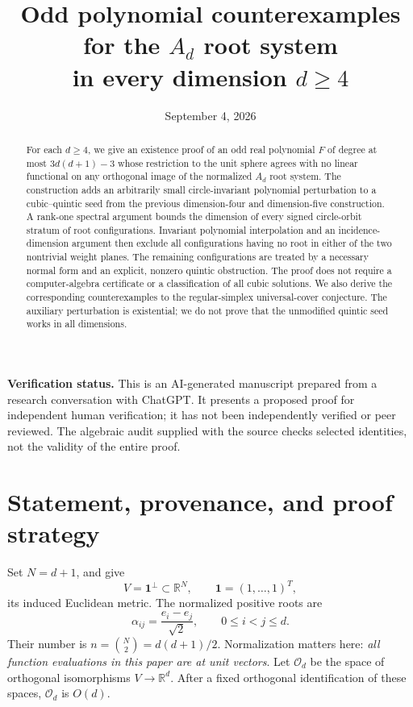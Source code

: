 \documentclass[11pt,reqno]{amsart}
\title[Odd polynomial counterexamples for the $A_d$ root system]
{Odd polynomial counterexamples for the $A_d$ root system\\
in every dimension $d\geq4$}
\author{}
\date{September 4, 2026}
\theoremstyle{definition}
\theoremstyle{remark}
\numberwithin{equation}{section}
\newcommand{\R}{\mathbb R}
\newcommand{\one}{\mathbf 1}
\newcommand{\Orth}{\mathcal O_d}
\begin{document}
\begin{abstract}
For each $d\geq4$, we give an existence proof of an odd real polynomial
$F$ of degree at most $3d(d+1)-3$ whose restriction to the unit sphere
agrees with no linear functional on any orthogonal image of the normalized
$A_d$ root system. The construction adds an arbitrarily small
circle-invariant polynomial perturbation to a cubic--quintic seed from the
previous dimension-four and dimension-five construction. A rank-one
spectral argument bounds the dimension of every signed circle-orbit
stratum of root configurations. Invariant polynomial interpolation and an
incidence-dimension argument then exclude all configurations having no
root in either of the two nontrivial weight planes. The remaining
configurations are treated by a necessary normal form and an explicit,
nonzero quintic obstruction. The proof does not require a
computer-algebra certificate or a classification of all cubic solutions.
We also derive the corresponding counterexamples to the regular-simplex
universal-cover conjecture. The auxiliary perturbation is existential;
we do not prove that the unmodified quintic seed works in all dimensions.
\end{abstract}
\maketitle

\noindent\textbf{Verification status.}
This is an AI-generated manuscript prepared from a research conversation
with ChatGPT. It presents a proposed proof for independent human
verification; it has not been independently verified or peer reviewed.
The algebraic audit supplied with the source checks selected identities,
not the validity of the entire proof.

\tableofcontents
\clearpage

\section{Statement, provenance, and proof strategy}\label{sec:introduction}

Set $N=d+1$, and give
\[
 V=\one^\perp\subset\R^N,\qquad \one=(1,\ldots,1)^T,
\]
its induced Euclidean metric. The normalized positive roots are
\begin{equation}\label{eq:roots}
 \alpha_{ij}=\frac{e_i-e_j}{\sqrt2},\qquad 0\leq i<j\leq d.
\end{equation}
Their number is $n=\binom N2=d(d+1)/2$. Normalization matters here:
\emph{all function evaluations in this paper are at unit vectors}.
Let $\Orth$ be the space of orthogonal isomorphisms $V\to\R^d$.
After a fixed orthogonal identification of these spaces, $\Orth$ is
$O(d)$.
\end{document}
